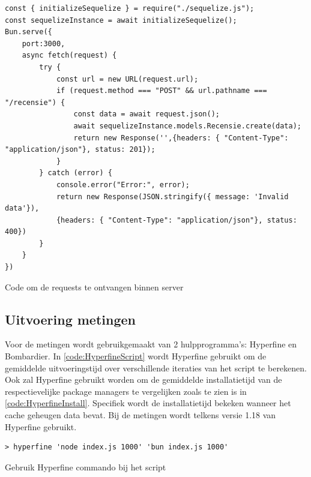 \begin{listing}[H]
  \centering
  \begin{verbatim}
const { initializeSequelize } = require("./sequelize.js");
const sequelizeInstance = await initializeSequelize();
Bun.serve({
    port:3000,
    async fetch(request) {
        try {
            const url = new URL(request.url);
            if (request.method === "POST" && url.pathname === "/recensie") {
                const data = await request.json();
                await sequelizeInstance.models.Recensie.create(data);
                return new Response('',{headers: { "Content-Type": "application/json"}, status: 201});
            }
        } catch (error) {
            console.error("Error:", error);
            return new Response(JSON.stringify({ message: 'Invalid data'}), 
            {headers: { "Content-Type": "application/json"}, status: 400})
        }
    }
})
\end{verbatim}
\caption{\label{code:BunServer}Code om de requests te ontvangen binnen server}
\end{listing}
\subsection{Uitvoering metingen}
Voor de metingen wordt gebruikgemaakt van 2 hulpprogramma's: Hyperfine en Bombardier.
In \ref{code:HyperfineScript} wordt Hyperfine gebruikt om de gemiddelde uitvoeringstijd over verschillende iteraties van het script te berekenen.
Ook zal Hyperfine gebruikt worden om de gemiddelde installatietijd van de respectievelijke package managers te vergelijken zoals 
te zien is in \ref{code:HyperfineInstall}. Specifiek wordt de installatietijd bekeken wanneer het cache geheugen data bevat.
Bij de metingen wordt telkens versie 1.18 van Hyperfine gebruikt.
\begin{listing}[H]
  \centering
  \begin{verbatim}
> hyperfine 'node index.js 1000' 'bun index.js 1000'
      \end{verbatim}
      \caption{\label{code:HyperfineScript}Gebruik Hyperfine commando bij het script}
\end{listing}

